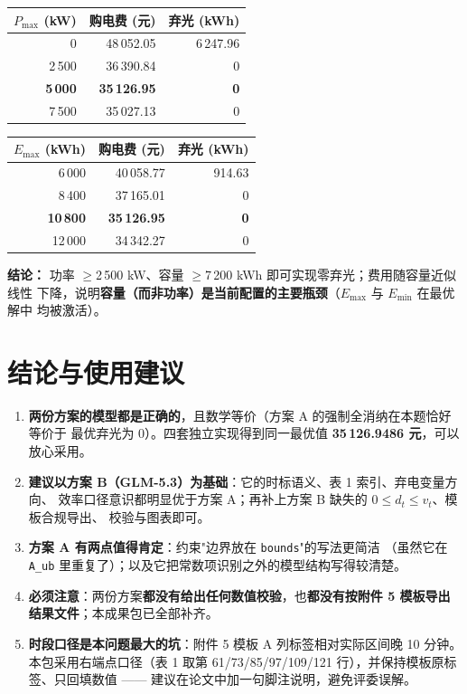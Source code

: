\documentclass[12pt,a4paper]{ctexart}
\begin{document}
\begin{minipage}[t]{0.49\textwidth}
\centering\footnotesize
\begin{tabular}{@{}r r r@{}}
\toprule
$P_{\max}$ (kW) & 购电费 (元) & 弃光 (kWh) \\
\midrule
0 & 48\,052.05 & 6\,247.96 \\
2\,500 & 36\,390.84 & 0 \\
\textbf{5\,000} & \textbf{35\,126.95} & \textbf{0} \\
7\,500 & 35\,027.13 & 0 \\
\bottomrule
\end{tabular}
\end{minipage}\hfill
\begin{minipage}[t]{0.49\textwidth}
\centering\footnotesize
\begin{tabular}{@{}r r r@{}}
\toprule
$E_{\max}$ (kWh) & 购电费 (元) & 弃光 (kWh) \\
\midrule
6\,000 & 40\,058.77 & 914.63 \\
8\,400 & 37\,165.01 & 0 \\
\textbf{10\,800} & \textbf{35\,126.95} & \textbf{0} \\
12\,000 & 34\,342.27 & 0 \\
\bottomrule
\end{tabular}
\end{minipage}

\vspace{0.8em}
\textbf{结论：} 功率 $\ge$2\,500 kW、容量 $\ge$7\,200 kWh 即可实现零弃光；费用随容量近似线性
下降，说明\textbf{容量（而非功率）是当前配置的主要瓶颈}（$E_{\max}$ 与 $E_{\min}$ 在最优解中
均被激活）。

\section{结论与使用建议}

\begin{enumerate}
  \item \textbf{两份方案的模型都是正确的}，且数学等价（方案 A 的强制全消纳在本题恰好等价于
        最优弃光为 0）。四套独立实现得到同一最优值 \textbf{35\,126.9486 元}，可以放心采用。
  \item \textbf{建议以方案 B（GLM-5.3）为基础}：它的时标语义、表 1 索引、弃电变量方向、
        效率口径意识都明显优于方案 A；再补上方案 B 缺失的 $0\le d_t\le v_t$、模板合规导出、
        校验与图表即可。
  \item \textbf{方案 A 有两点值得肯定}：约束"边界放在 \texttt{bounds}"的写法更简洁
        （虽然它在 \texttt{A\_ub} 里重复了）；以及它把常数项识别之外的模型结构写得较清楚。
  \item \textbf{必须注意}：两份方案\textbf{都没有给出任何数值校验}，也\textbf{都没有按附件 5
        模板导出结果文件}；本成果包已全部补齐。
  \item \textbf{时段口径是本问题最大的坑}：附件 5 模板 A 列标签相对实际区间晚 10 分钟。
        本包采用右端点口径（表 1 取第 61/73/85/97/109/121 行），并保持模板原标签、只回填数值
        —— 建议在论文中加一句脚注说明，避免评委误解。
\end{enumerate}
\end{document}
